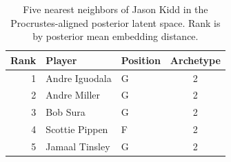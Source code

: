 \begin{table}[htbp]
  \centering\small
  \begin{tabular}{rllc}
    \toprule
    Rank & Player & Position & Archetype \\
    \midrule
    1 & Andre Iguodala & G & 2 \\
    2 & Andre Miller & G & 2 \\
    3 & Bob Sura & G & 2 \\
    4 & Scottie Pippen & F & 2 \\
    5 & Jamaal Tinsley & G & 2 \\
    \bottomrule
  \end{tabular}
  \caption{Five nearest neighbors of Jason Kidd in the Procrustes-aligned posterior latent space. Rank is by posterior mean embedding distance.}
  \label{tab:Jason_Kidd_neighbors}
\end{table}

